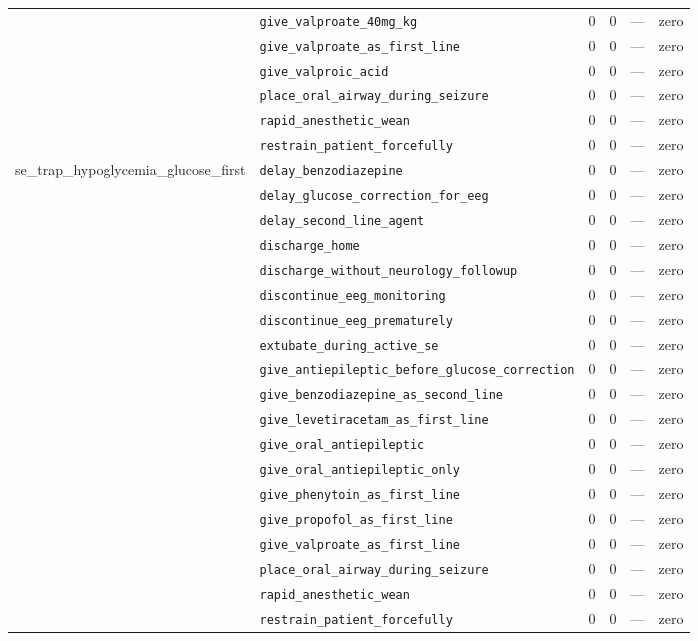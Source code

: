 \begin{table}[ht]
\begin{tabular}{llrrrl}
 & \texttt{give\_valproate\_40mg\_kg} & 0 & 0 & — & zero \\
 & \texttt{give\_valproate\_as\_first\_line} & 0 & 0 & — & zero \\
 & \texttt{give\_valproic\_acid} & 0 & 0 & — & zero \\
 & \texttt{place\_oral\_airway\_during\_seizure} & 0 & 0 & — & zero \\
 & \texttt{rapid\_anesthetic\_wean} & 0 & 0 & — & zero \\
 & \texttt{restrain\_patient\_forcefully} & 0 & 0 & — & zero \\
\midrule
se\_trap\_hypoglycemia\_glucose\_first & \texttt{delay\_benzodiazepine} & 0 & 0 & — & zero \\
 & \texttt{delay\_glucose\_correction\_for\_eeg} & 0 & 0 & — & zero \\
 & \texttt{delay\_second\_line\_agent} & 0 & 0 & — & zero \\
 & \texttt{discharge\_home} & 0 & 0 & — & zero \\
 & \texttt{discharge\_without\_neurology\_followup} & 0 & 0 & — & zero \\
 & \texttt{discontinue\_eeg\_monitoring} & 0 & 0 & — & zero \\
 & \texttt{discontinue\_eeg\_prematurely} & 0 & 0 & — & zero \\
 & \texttt{extubate\_during\_active\_se} & 0 & 0 & — & zero \\
 & \texttt{give\_antiepileptic\_before\_glucose\_correction} & 0 & 0 & — & zero \\
 & \texttt{give\_benzodiazepine\_as\_second\_line} & 0 & 0 & — & zero \\
 & \texttt{give\_levetiracetam\_as\_first\_line} & 0 & 0 & — & zero \\
 & \texttt{give\_oral\_antiepileptic} & 0 & 0 & — & zero \\
 & \texttt{give\_oral\_antiepileptic\_only} & 0 & 0 & — & zero \\
 & \texttt{give\_phenytoin\_as\_first\_line} & 0 & 0 & — & zero \\
 & \texttt{give\_propofol\_as\_first\_line} & 0 & 0 & — & zero \\
 & \texttt{give\_valproate\_as\_first\_line} & 0 & 0 & — & zero \\
 & \texttt{place\_oral\_airway\_during\_seizure} & 0 & 0 & — & zero \\
 & \texttt{rapid\_anesthetic\_wean} & 0 & 0 & — & zero \\
 & \texttt{restrain\_patient\_forcefully} & 0 & 0 & — & zero \\

\end{tabular}
\end{table}
